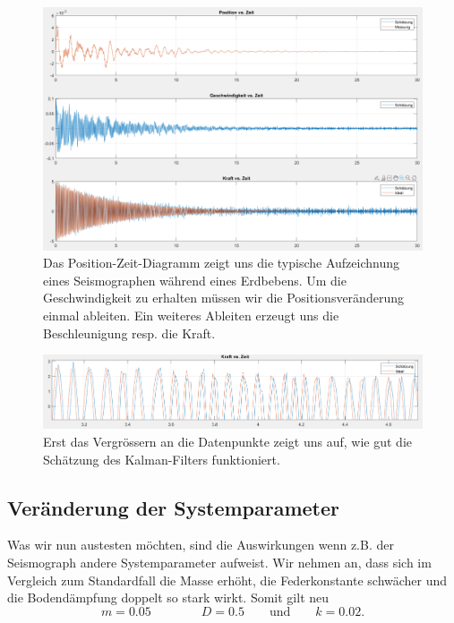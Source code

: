 \begin{figure}
	\begin{center}
		\includegraphics[width=15cm]{papers/erdbeben/Standard_alles.PNG}
		\caption{Das Position-Zeit-Diagramm zeigt uns die typische Aufzeichnung eines Seismographen während eines Erdbebens. Um die Geschwindigkeit zu erhalten müssen wir die Positionsveränderung einmal ableiten. Ein weiteres Ableiten erzeugt uns die Beschleunigung resp. die Kraft.}
	\end{center}
\end{figure}

\begin{figure}
	\begin{center}
		\includegraphics[width=15cm]{papers/erdbeben/Erdbeben_Standardfall_Zoom.PNG}
		\caption{Erst das Vergrössern an die Datenpunkte zeigt uns auf, wie gut die Schätzung des Kalman-Filters funktioniert.}
	\end{center}
\end{figure}

\subsection{Veränderung der Systemparameter}
Was wir nun austesten möchten, sind die Auswirkungen wenn z.B. der Seismograph andere Systemparameter aufweist.
Wir nehmen an, dass sich im Vergleich zum Standardfall die Masse erhöht, die Federkonstante schwächer und die Bodendämpfung doppelt so stark wirkt.
Somit gilt neu
\[ 
m = 0.05 
\qquad \qquad
D = 0.5
\qquad \text{und} \qquad
k = 0.02.
\]

